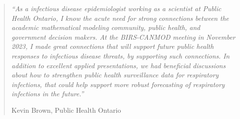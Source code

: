 \begin{quote}
{\it ``As a infectious disease epidemiologist working as a scientist at Public Health Ontario, I know the acute need for strong connections between the academic mathematical modeling community, public health, and government decision makers. At the BIRS-CANMOD meeting in November 2023, I made great connections that will support future public health responses to infectious disease threats, by supporting such connections. In addition to excellent applied presentations, we had beneficial discussions about how to strengthen public health surveillance data for respiratory infections, that could help support more robust forecasting of respiratory infections in the future.''}

\hfill Kevin Brown, Public Health Ontario
\end{quote}